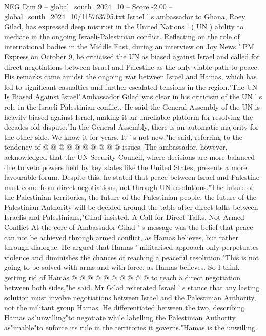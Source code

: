 \begin{textsample}{NEG Dim 9 – global\_south\_2024\_10 – Score -2.00 – global\_south\_2024\_10/115763795.txt}  \label{ex:f9_neg_369}
Israel ' s ambassador to Ghana, Roey Gilad, has expressed deep mistrust in the United Nations ' ( UN ) ability to mediate in the ongoing Israeli-Palestinian conflict.
Reflecting on the role of international bodies in the Middle East, during an interview on Joy News ' PM Express on October 9, he criticised the UN as biased against Israel and called for direct negotiations between Israel and Palestine as the only viable path to peace.
His remarks came amidst the ongoing war between Israel and Hamas, which has led to significant casualties and further escalated tensions in the region."The UN Is Biased Against Israel"Ambassador Gilad was clear in his criticism of the UN ' s role in the Israeli-Palestinian conflict.
He said the General Assembly of the UN is heavily biased against Israel, making it an unreliable platform for resolving the decades-old dispute."In the General Assembly, there is an automatic majority for the other side.
We know it for years.
It ' s not new,"he said, referring to the tendency of @ @ @ @ @ @ @ @ @ @ issues.
The ambassador, however, acknowledged that the UN Security Council, where decisions are more balanced due to veto powers held by key states like the United States, presents a more favourable forum.
Despite this, he stated that peace between Israel and Palestine must come from direct negotiations, not through UN resolutions."The future of the Palestinian territories, the future of the Palestinian people, the future of the Palestinian Authority will be decided around the table after direct talks between Israelis and Palestinians,"Gilad insisted.
A Call for Direct Talks, Not Armed Conflict At the core of Ambassador Gilad ' s message was the belief that peace can not be achieved through armed conflict, as Hamas believes, but rather through dialogue.
He argued that Hamas ' militarised approach only perpetuates violence and diminishes the chances of reaching a peaceful resolution."This is not going to be solved with arms and with force, as Hamas believes.
So I think getting rid of Hamas @ @ @ @ @ @ @ @ @ @ to reach a direct negotiation between both sides,"he said.
Mr Gilad reiterated Israel ' s stance that any lasting solution must involve negotiations between Israel and the Palestinian Authority, not the militant group Hamas.
He differentiated between the two, describing Hamas as"unwilling"to negotiate while labelling the Palestinian Authority as"unable"to enforce its rule in the territories it governs."Hamas is the unwilling.

\end{textsample}
